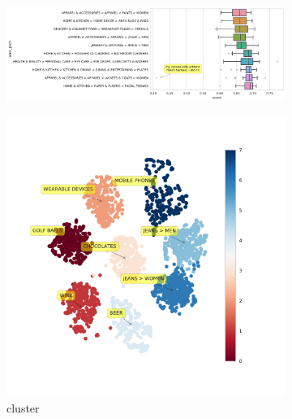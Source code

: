 
\begin{figure}
\begin{subfigure}{0.4\textwidth}
   \includegraphics[width=\columnwidth]{resources/noise-detect}
   \caption{}
   \label{fig:Accuracy-Per-Sample}
\end{subfigure}
\begin{subfigure}{0.2\textwidth}
   \includegraphics[width=\textwidth]{resources/cluster}
   \caption{cluster}
   \label{fig:Accuracy-Per-Sample}
\end{subfigure}
\begin{subfigure}{0.2\textwidth}

\end{subfigure}
\end{figure}
